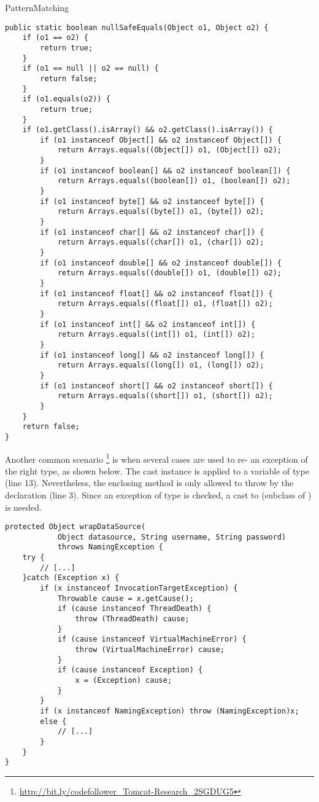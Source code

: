 \begin{pattern}{PatternMatching}
\begin{verbatim}
public static boolean nullSafeEquals(Object o1, Object o2) {
	if (o1 == o2) {
		return true;
	}
	if (o1 == null || o2 == null) {
		return false;
	}
	if (o1.equals(o2)) {
		return true;
	}
	if (o1.getClass().isArray() && o2.getClass().isArray()) {
		if (o1 instanceof Object[] && o2 instanceof Object[]) {
			return Arrays.equals((Object[]) o1, (Object[]) o2);
		}
		if (o1 instanceof boolean[] && o2 instanceof boolean[]) {
			return Arrays.equals((boolean[]) o1, (boolean[]) o2);
		}
		if (o1 instanceof byte[] && o2 instanceof byte[]) {
			return Arrays.equals((byte[]) o1, (byte[]) o2);
		}
		if (o1 instanceof char[] && o2 instanceof char[]) {
			return Arrays.equals((char[]) o1, (char[]) o2);
		}
		if (o1 instanceof double[] && o2 instanceof double[]) {
			return Arrays.equals((double[]) o1, (double[]) o2);
		}
		if (o1 instanceof float[] && o2 instanceof float[]) {
			return Arrays.equals((float[]) o1, (float[]) o2);
		}
		if (o1 instanceof int[] && o2 instanceof int[]) {
			return Arrays.equals((int[]) o1, (int[]) o2);
		}
		if (o1 instanceof long[] && o2 instanceof long[]) {
			return Arrays.equals((long[]) o1, (long[]) o2);
		}
		if (o1 instanceof short[] && o2 instanceof short[]) {
			return Arrays.equals((short[]) o1, (short[]) o2);
		}
	}
	return false;
}
\end{verbatim}

Another common scenario%
\footnote{\url{http://bit.ly/codefollower_Tomcat-Research_2SGDUG5}}
is when several cases are used to re- an exception of the right type, as shown below.
The cast instance is applied to a variable of type 
(line 13).
Nevertheless, the enclosing method is only allowed to throw  by the  declaration (line 3).
Since an exception of type  is checked,
a cast to  (subclass of ) is needed.

\begin{verbatim}
protected Object wrapDataSource(
			Object datasource, String username, String password)
			throws NamingException {
	try {
		// [...]
	}catch (Exception x) {
		if (x instanceof InvocationTargetException) {
			Throwable cause = x.getCause();
			if (cause instanceof ThreadDeath) {
				throw (ThreadDeath) cause;
			}
			if (cause instanceof VirtualMachineError) {
				throw (VirtualMachineError) cause;
			}
			if (cause instanceof Exception) {
				x = (Exception) cause;
			}
		}
		if (x instanceof NamingException) throw (NamingException)x;
		else {
			// [...]
		}
	}
}
\end{verbatim}


\end{pattern}
